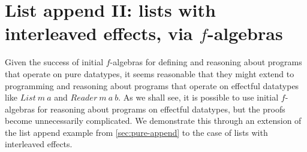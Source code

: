 \documentclass{jfp1}
\newcommand{\fold}[1]{\llparenthesis #1 \rrparenthesis}
\begin{document}




\section{List append II: lists with interleaved effects, via \texorpdfstring{$f$}{f}-algebras}
\label{sec:direct-eappend}

Given the success of initial $f$-algebras for defining and reasoning
about programs that operate on pure datatypes, it seems reasonable
that they might extend to programming and reasoning about programs
that operate on effectful datatypes like $\mathit{List}~m~a$ and
$\mathit{Reader}~m~a~b$. As we shall see, it is possible to use
initial $f$-algebras for reasoning about programs on effectful
datatypes, but the proofs become unnecessarily complicated. We
demonstrate this through an extension of the list append example from
\autoref{sec:pure-append} to the case of lists with interleaved
effects.
\end{document}
